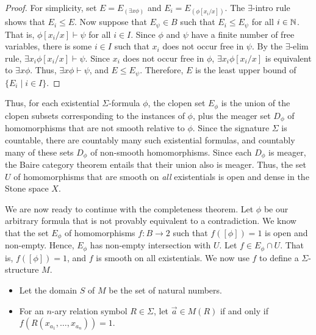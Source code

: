 \begin{proof} For simplicity, set $E=E_{(\exists x\phi )}$ and
  $E_i=E_{(\phi [x_i/x])}$.  The $\exists$-intro rule shows that
  $E_i\leq E$.  Now suppose that $E_\psi \in B$ such that
  $E_i\leq E_\psi $ for all $i\in \mathbb N$.  That is,
  $\phi [x_i/x]\vdash \psi$ for all $i\in I$.  Since $\phi$ and $\psi$
  have a finite number of free variables, there is some $i\in I$ such
  that $x_i$ does not occur free in $\psi$.  By the $\exists$-elim
  rule, $\exists x_i\phi [x_i/x]\vdash \psi$.  Since $x_i$ does not
  occur free in $\phi$, $\exists x_i\phi [x_i/x]$ is equivalent to
  $\exists x\phi$.  Thus, $\exists x\phi\vdash \psi$, and
  $E\leq E_\psi$.  Therefore, $E$ is the least upper bound of
  $\{ E_i \mid i\in I \}$.  \end{proof}

 Thus, for each existential $\Sigma$-formula $\phi$, the clopen set
 $E_\phi$ is the union of the clopen subsets corresponding to the
 instances of $\phi$, plus the meager set $D_\phi$ of homomorphisms
 that are not smooth relative to $\phi$.  Since the signature $\Sigma$
 is countable, there are countably many such existential formulas, and
 countably many of these sets $D_\phi$ of non-smooth homomorphisms.
 Since each $D_\phi$ is meager, the Baire category theorem entails
 that their union also is meager.  Thus, the set $U$ of homomorphisms
 that are smooth on {\it all} existentials is open and dense in the
 Stone space $X$.

We are now ready to continue with the completeness theorem.  Let
$\phi$ be our arbitrary formula that is not provably equivalent to a
contradiction.  We know that the set $E_\phi$ of homomorphisms
$f:B\to 2$ such that $f([\phi ])=1$ is open and non-empty.  Hence,
$E_\phi$ has non-empty intersection with $U$.  Let
$f\in E_\phi\cap U$.  That is, $f([\phi ])=1$, and $f$ is smooth on
all existentials.  We now use $f$ to define a $\Sigma$-structure $M$.
  
\begin{itemize}
  \item Let the domain $S$ of $M$ be the set of natural numbers.
  \item For an $n$-ary relation symbol $R\in \Sigma$, let
    $\vec{a}\in M(R)$ if and only if $f(R(x_{a_1},\dots
    ,x_{a_n}))=1$. \end{itemize}

